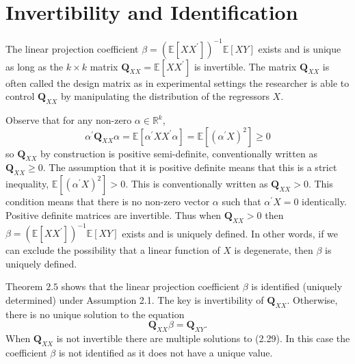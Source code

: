 \documentclass[10pt]{article}
\begin{document}
\section{Invertibility and Identification}
The linear projection coefficient $\beta=\left(\mathbb{E}\left[X X^{\prime}\right]\right)^{-1} \mathbb{E}[X Y]$ exists and is unique as long as the $k \times k$ matrix $\boldsymbol{Q}_{X X}=\mathbb{E}\left[X X^{\prime}\right]$ is invertible. The matrix $\boldsymbol{Q}_{X X}$ is often called the design matrix as in experimental settings the researcher is able to control $\boldsymbol{Q}_{X X}$ by manipulating the distribution of the regressors $X$.

Observe that for any non-zero $\alpha \in \mathbb{R}^{k}$,
$$
\alpha^{\prime} \boldsymbol{Q}_{X X} \alpha=\mathbb{E}\left[\alpha^{\prime} X X^{\prime} \alpha\right]=\mathbb{E}\left[\left(\alpha^{\prime} X\right)^{2}\right] \geq 0
$$
so $\boldsymbol{Q}_{X X}$ by construction is positive semi-definite, conventionally written as $\boldsymbol{Q}_{X X} \geq 0$. The assumption that it is positive definite means that this is a strict inequality, $\mathbb{E}\left[\left(\alpha^{\prime} X\right)^{2}\right]>0$. This is conventionally written as $\boldsymbol{Q}_{X X}>0$. This condition means that there is no non-zero vector $\alpha$ such that $\alpha^{\prime} X=0$ identically. Positive definite matrices are invertible. Thus when $\boldsymbol{Q}_{X X}>0$ then $\beta=\left(\mathbb{E}\left[X X^{\prime}\right]\right)^{-1} \mathbb{E}[X Y]$ exists and is uniquely defined. In other words, if we can exclude the possibility that a linear function of $X$ is degenerate, then $\beta$ is uniquely defined.

Theorem $2.5$ shows that the linear projection coefficient $\beta$ is identified (uniquely determined) under Assumption 2.1. The key is invertibility of $\boldsymbol{Q}_{X X}$. Otherwise, there is no unique solution to the equation
$$
\boldsymbol{Q}_{X X} \beta=\boldsymbol{Q}_{X Y} .
$$
When $\boldsymbol{Q}_{X X}$ is not invertible there are multiple solutions to (2.29). In this case the coefficient $\beta$ is not identified as it does not have a unique value.
\end{document}

